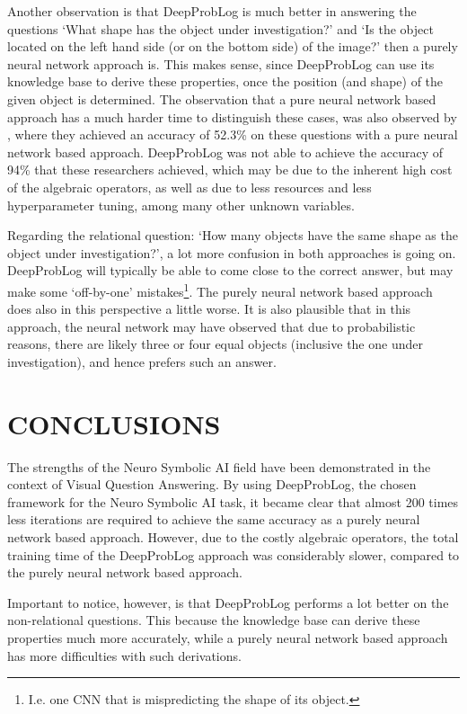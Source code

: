 \documentclass[english]{sobraep}
\begin{document}
Another observation is that DeepProbLog is much better in answering the questions `What shape has the object under investigation?' and `Is the object located on the left hand side (or on the bottom side) of the image?' then a purely neural network approach is. This makes sense, since DeepProbLog can use its knowledge base to derive these properties, once the position (and shape) of the given object is determined. The observation that a pure neural network based approach has a much harder time to distinguish these cases, was also observed by \cite{sort_of_clevr_dataset}, where they achieved an accuracy of 52.3\% on these questions with a pure neural network based approach. DeepProbLog was not able to achieve the accuracy of 94\% that these researchers achieved, which may be due to the inherent high cost of the algebraic operators, as well as due to less resources and less hyperparameter tuning, among many other unknown variables.

Regarding the relational question: `How many objects have the same shape as the object under investigation?', a lot more confusion in both approaches is going on. DeepProbLog will typically be able to come close to the correct answer, but may make some `off-by-one' mistakes\footnote{I.e. one CNN that is mispredicting the shape of its object.}. The purely neural network based approach does also in this perspective a little worse. It is also plausible that in this approach, the neural network may have observed that due to probabilistic reasons, there are likely three or four equal objects (inclusive the one under investigation), and hence prefers such an answer.

\section{CONCLUSIONS}
\label{sec:conclusions}
The strengths of the Neuro Symbolic AI field have been demonstrated in the context of Visual Question Answering. By using DeepProbLog, the chosen framework for the Neuro Symbolic AI task, it became clear that almost 200 times less iterations are required to achieve the same accuracy as a purely neural network based approach. However, due to the costly algebraic operators, the total training time of the DeepProbLog approach was considerably slower, compared to the purely neural network based approach. 

Important to notice, however, is that DeepProbLog performs a lot better on the non-relational questions. This because the knowledge base can derive these properties much more accurately, while a purely neural network based approach has more difficulties with such derivations.
\end{document}

